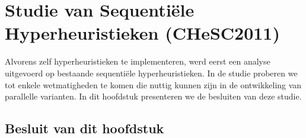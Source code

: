 \chapter{Studie van Sequenti\"ele Hyperheuristieken (CHeSC2011)}


Alvorens zelf hyperheuristieken te implementeren, werd eerst een analyse uitgevoerd op bestaande sequenti\"ele hyperheuristieken. In de studie proberen we tot enkele wetmatigheden te komen die nuttig kunnen zijn in de ontwikkeling van parallelle varianten. In dit hoofdstuk presenteren we de besluiten van deze studie.









\section{Besluit van dit hoofdstuk}





